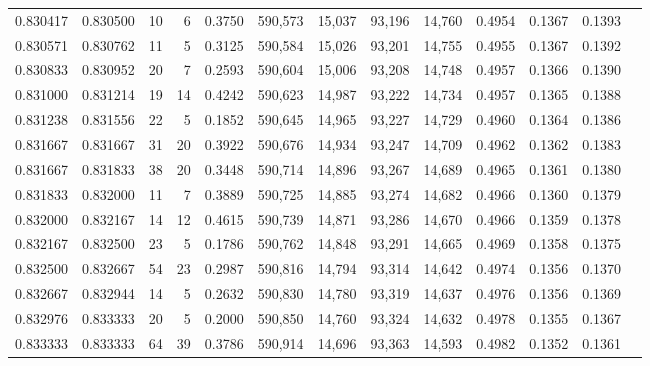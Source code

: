 \begin{tabular}{rrrrrrrrrrrrr}
0.830417 & 0.830500 &    10 &   6 &                                     0.3750 & 590,573 &  15,037 &  93,196 &  14,760 & 0.4954 & 0.1367 & 0.1393 \\
0.830571 & 0.830762 &    11 &   5 &                                     0.3125 & 590,584 &  15,026 &  93,201 &  14,755 & 0.4955 & 0.1367 & 0.1392 \\
0.830833 & 0.830952 &    20 &   7 &                                     0.2593 & 590,604 &  15,006 &  93,208 &  14,748 & 0.4957 & 0.1366 & 0.1390 \\
0.831000 & 0.831214 &    19 &  14 &                                     0.4242 & 590,623 &  14,987 &  93,222 &  14,734 & 0.4957 & 0.1365 & 0.1388 \\
0.831238 & 0.831556 &    22 &   5 &                                     0.1852 & 590,645 &  14,965 &  93,227 &  14,729 & 0.4960 & 0.1364 & 0.1386 \\
0.831667 & 0.831667 &    31 &  20 &                                     0.3922 & 590,676 &  14,934 &  93,247 &  14,709 & 0.4962 & 0.1362 & 0.1383 \\
0.831667 & 0.831833 &    38 &  20 &                                     0.3448 & 590,714 &  14,896 &  93,267 &  14,689 & 0.4965 & 0.1361 & 0.1380 \\
0.831833 & 0.832000 &    11 &   7 &                                     0.3889 & 590,725 &  14,885 &  93,274 &  14,682 & 0.4966 & 0.1360 & 0.1379 \\
0.832000 & 0.832167 &    14 &  12 &                                     0.4615 & 590,739 &  14,871 &  93,286 &  14,670 & 0.4966 & 0.1359 & 0.1378 \\
0.832167 & 0.832500 &    23 &   5 &                                     0.1786 & 590,762 &  14,848 &  93,291 &  14,665 & 0.4969 & 0.1358 & 0.1375 \\
0.832500 & 0.832667 &    54 &  23 &                                     0.2987 & 590,816 &  14,794 &  93,314 &  14,642 & 0.4974 & 0.1356 & 0.1370 \\
0.832667 & 0.832944 &    14 &   5 &                                     0.2632 & 590,830 &  14,780 &  93,319 &  14,637 & 0.4976 & 0.1356 & 0.1369 \\
0.832976 & 0.833333 &    20 &   5 &                                     0.2000 & 590,850 &  14,760 &  93,324 &  14,632 & 0.4978 & 0.1355 & 0.1367 \\
0.833333 & 0.833333 &    64 &  39 &                                     0.3786 & 590,914 &  14,696 &  93,363 &  14,593 & 0.4982 & 0.1352 & 0.1361 \\

\end{tabular}
